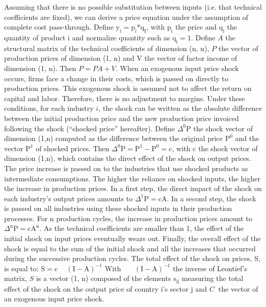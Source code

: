 \documentclass[11pt,a4paper]{article}
\begin{document}
Assuming that there is no possible substitution between inputs (i.e. that technical coefficients are fixed), we can derive a price equation under the assumption of complete cost pass-through.
Define ${{\text{y}}_{\text{i}}}={{\text{p}}_{\text{i}}}\text{*}{{\text{q}}_{\text{I}}}$, with ${{\text{p}}_{\text{i}}}$ the price and ${{\text{q}}_{\text{i}}}$ the quantity of product $\text{i}$ and normalize quantity such as ${{\text{q}}_{\text{i}}}=1$.
Define $A$ the structural matrix of the technical coefficients of dimension (n, n), $P$ the vector of production prices of dimension (1, n) and V the vector of factor income of dimension (1, n). Then $P=PA+V$.
When an exogenous input price shock occurs, firms face a change in their costs, which is passed on directly to production prices. This exogenous shock is assumed not to affect the return on capital and labor. Therefore, there is no adjustment to margins. Under these conditions, for each industry $i$, the shock can be written as the absolute difference between the initial production price and the new production price invoiced following the shock (“shocked price” hereafter).
Define ${{\Delta }^{0}}\text{P}$ the shock vector of dimension (1,n) computed as the difference between the original price ${{\text{P}}^{0}}$ and the vector ${{\text{P}}^{1}}$ of shocked prices. Then ${{\Delta }^{0}}\text{P}={{\text{P}}^{1}}-{{\text{P}}^{0}}=\text{c}$, with $\text{c}$ the shock vector of dimension (1,n), which contains the direct effect of the shock on output prices.
The price increase is passed on to the industries that use shocked products as intermediate consumptions. The higher the reliance on shocked inputs, the higher the increase in production prices.
In a first step, the direct impact of the shock on each industry's output prices amounts to ${{\Delta }^{1}}\text{P}=\text{cA}$.
In a second step, the shock is passed on all industries using these shocked inputs in their production processes. For n production cycles, the increase in production prices amount to ${{\Delta }^{\text{n}}}\text{P}=\text{c}{{\text{A}}^{\text{n}}}$.
As the technical coefficients are smaller than 1, the effect of the initial shock on input prices eventually wears out. Finally, the overall effect of the shock is equal to the sum of the initial shock and all the increases that occurred during the successive production cycles. The total effect of the shock on prices, S, is equal to: 
	$\text{S}=\text{c }\!\!~\!\!\text{ }{{\left( \text{I}-\text{A} \right)}^{-1}}$
With $\text{ }\!\!~\!\!\text{ }{{\left( \text{I}-\text{A} \right)}^{-1}}$ the inverse of Leontief’s matrix, $S$ is a vector (1, n) composed of the elements ${{\text{s}}_{\text{ij}}}$ measuring the total effect of the shock on the output price of country i's sector j and $C~$ the vector of an exogenous input price shock.
\end{document}
